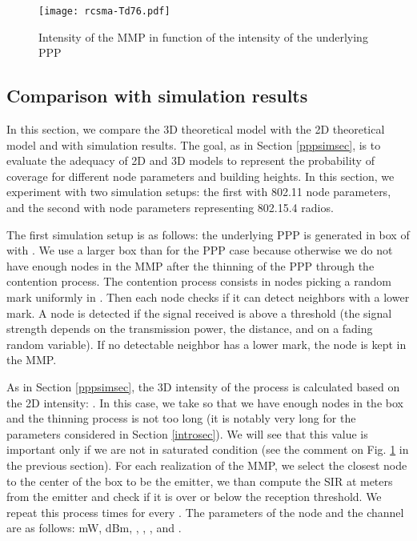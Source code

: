 \documentclass{sig-alternate-05-2015}
\begin{document}
\begin{figure}[ht]
  \centering
  \texttt{[image: rcsma-Td76.pdf]}
  \caption{Intensity of the MMP in function of the intensity of the underlying PPP}
  \label{rcsmafig}
\end{figure}

\subsection{Comparison with simulation results}
\label{mmpsimsec}

In this section, we compare the 3D theoretical model with the 2D theoretical model and with simulation results. The goal, as in Section \ref{pppsimsec}, is to evaluate the adequacy of 2D and 3D models to represent the probability of coverage for different node parameters and building heights. In this section, we experiment with two simulation setups: the first with 802.11 node parameters, and the second with node parameters representing 802.15.4 radios.

The first simulation setup is as follows: the underlying PPP is generated in box of  with . We use a larger box than for the PPP case because otherwise we do not have enough nodes in the MMP after the thinning of the PPP through the contention process. The contention process consists in nodes picking a random mark uniformly in . Then each node checks if it can detect neighbors with a lower mark. A node is detected if the signal received is above a threshold (the signal strength depends on the transmission power, the distance, and on a fading random variable). If no detectable neighbor has a lower mark, the node is kept in the MMP.

As in Section \ref{pppsimsec}, the 3D intensity of the process is calculated based on the 2D intensity: . In this case, we take  so that we have enough nodes in the box and the thinning process is not too long (it is notably very long for the parameters considered in Section \ref{introsec}). We will see that this value is important only if we are not in saturated condition (see the comment on Fig. \ref{rcsmafig} in the previous section). For each realization of the MMP, we select the closest node to the center of the box to be the emitter, we than compute the SIR at  meters from the emitter and check if it is over or below the reception threshold. We repeat this process  times for every . The parameters of the node and the channel are as follows: mW, dBm, , , ,  and .
\end{document}
